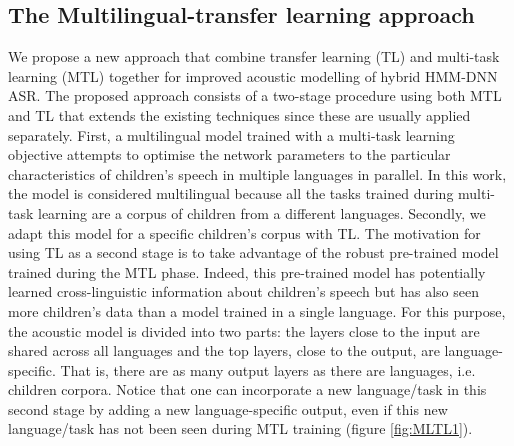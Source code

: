 
\subsection{The Multilingual-transfer learning approach}
\label{section:method}

We propose a new approach that combine transfer learning (TL) and multi-task learning (MTL) together for improved acoustic modelling of hybrid HMM-DNN ASR. The proposed approach consists of a two-stage procedure using both MTL and TL that extends the existing techniques since these are usually applied separately. First, a multilingual model trained with a multi-task learning objective attempts to optimise the network parameters to the particular characteristics of children's speech in multiple languages in parallel. In this work, the model is considered multilingual because all the tasks trained during multi-task learning are a corpus of children from  a different languages.
Secondly, we adapt this model for a specific children's corpus with TL. The motivation for using TL as a second stage is to take advantage of the robust pre-trained model trained during the MTL phase. Indeed, this pre-trained model has potentially learned cross-linguistic information about children's speech but has also seen more children's data than a model trained in a single language. 
For this purpose, the acoustic model is divided into two parts: the layers close to the input are shared across all languages and the top layers, close to the output, are language-specific. That is, there are as many output layers as there are languages, i.e. children corpora. Notice that one can incorporate a new language/task in this second stage by adding a new language-specific output,  even if this new language/task has not been seen during  MTL training (figure \ref{fig:MLTL1}).

